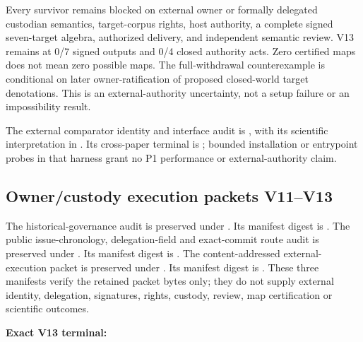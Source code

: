 Every survivor remains blocked on external owner or formally delegated
custodian semantics, target-corpus rights, host authority, a complete signed
seven-target algebra, authorized delivery, and independent semantic review.
V13 remains at 0/7 signed outputs and 0/4 closed authority acts. Zero certified
maps does not mean zero possible maps. The full-withdrawal counterexample is
conditional on later owner-ratification of proposed closed-world target
denotations. This is an external-authority uncertainty, not a setup failure or
an impossibility result.

The external comparator identity and interface audit is
,
with its scientific interpretation in
.
Its cross-paper terminal is ; bounded
installation or entrypoint probes in that harness grant no P1 performance or
external-authority claim.

\subsection{Owner/custody execution packets V11--V13}
The historical-governance audit is preserved under
.
Its  manifest digest is
.
The public issue-chronology, delegation-field and exact-commit route audit is
preserved under
.
Its manifest digest is
.
The content-addressed external-execution packet is preserved under
.
Its manifest digest is
.
These three manifests verify the retained packet bytes only; they do not supply
external identity, delegation, signatures, rights, custody, review, map
certification or scientific outcomes.
\begin{center}
\begin{minipage}{0.96\linewidth}
\textbf{Exact V13 terminal:}\par
\small\raggedright
{}
\end{minipage}
\end{center}

